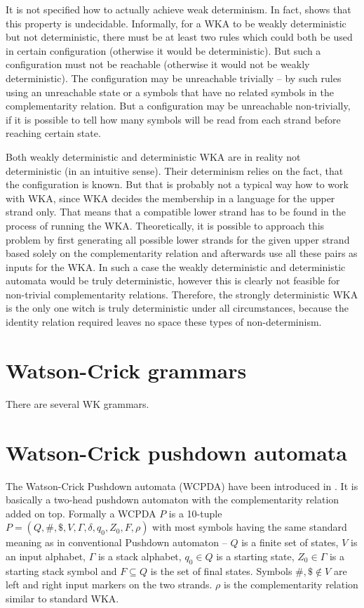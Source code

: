 It is not specified how to actually achieve weak determinism. In fact, \cite{DETERM_WKA} shows that this property is undecidable. Informally, for a WKA to be weakly deterministic but not deterministic, there must be at least two rules which could both be used in certain configuration (otherwise it would be deterministic). But such a configuration must not be reachable (otherwise it would not be weakly deterministic). The configuration may be unreachable trivially -- by such rules using an unreachable state or a symbols that have no related symbols in the complementarity relation. But a configuration may be unreachable non-trivially, if it is possible to tell how many symbols will be read from each strand before reaching certain state.

Both weakly deterministic and deterministic WKA are in reality not deterministic (in an intuitive sense). Their determinism relies on the fact, that the configuration is known. But that is probably not a typical way how to work with WKA, since WKA decides the membership in a language for the upper strand only. That means that a compatible lower strand has to be found in the process of running the WKA. Theoretically, it is possible to approach this problem by first generating all possible lower strands for the given upper strand based solely on the complementarity relation and afterwards use all these pairs as inputs for the WKA. In such a case the weakly deterministic and deterministic automata would be truly deterministic, however this is clearly not feasible for non-trivial complementarity relations. Therefore, the strongly deterministic WKA is the only one witch is truly deterministic under all circumstances, because the identity relation required leaves no space these types of non-determinism.

\section{Watson-Crick grammars}
There are several WK grammars.


\section{Watson-Crick pushdown automata}
The Watson-Crick Pushdown automata (WCPDA) have been introduced in \cite{WK_PUSHDOWN_AUT}. It is basically a two-head pushdown automaton with the complementarity relation added on top. Formally a WCPDA $P$ is a 10-tuple $P = (Q, \#, \$, V, \Gamma, \delta, q_0, Z_0, F, \rho)$ with most symbols having the same standard meaning as in conventional Pushdown automaton -- $Q$ is a finite set of states, $V$ is an input alphabet, $\Gamma$ is a stack alphabet, $q_0 \in Q$ is a starting state, $Z_0 \in \Gamma$ is a starting stack symbol and $F \subseteq Q$ is the set of final states. Symbols $\#, \$ \notin V$ are left and right input markers on the two strands. $\rho$ is the complementarity relation similar to standard WKA.

